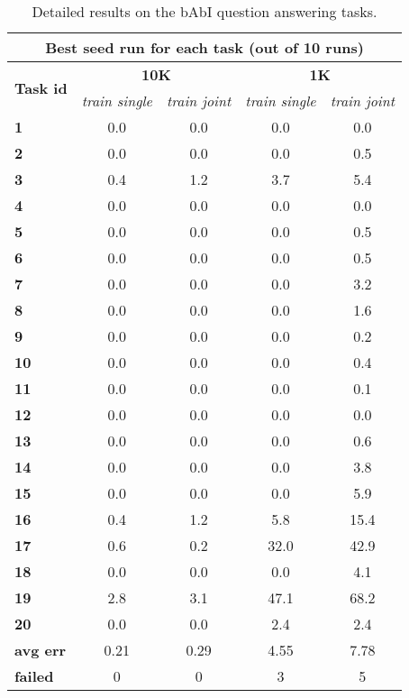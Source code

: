 \begin{table}[t!]
\centering
\caption{Detailed results on the bAbI question answering tasks.}
\label{tbl:babi_details}
\begin{subtable}{0.57\textwidth}
\centering
\begin{adjustbox}{max width=\textwidth}
\begin{tabular}{lcccc}
\toprule
\multicolumn{5}{c}{\bf Best seed run for each task (out of 10 runs) } \\ \midrule
\multirow{2}{*}{ \bf Task id } & \multicolumn{2}{c}{ \bf 10K } & \multicolumn{2}{c}{ \bf 1K } \\  \cmidrule{2-5}
& \textit{train single} & \textit{train joint} & \textit{train single} & \textit{train joint} \\ \midrule
\bf 1 & 0.0 & 0.0 & 0.0 & 0.0 \\
\bf 2 & 0.0 & 0.0 & 0.0 & 0.5 \\
\bf 3 & 0.4 & 1.2 & 3.7 & 5.4 \\
\bf 4 & 0.0 & 0.0 & 0.0 & 0.0 \\
\bf 5 & 0.0 & 0.0 & 0.0 & 0.5 \\
\bf 6 & 0.0 & 0.0 & 0.0 & 0.5 \\
\bf 7 & 0.0 & 0.0 & 0.0 & 3.2 \\
\bf 8 & 0.0 & 0.0 & 0.0 & 1.6 \\
\bf 9 & 0.0 & 0.0 & 0.0 & 0.2 \\
\bf 10 & 0.0 & 0.0 & 0.0 & 0.4 \\
\bf 11 & 0.0 & 0.0 & 0.0 & 0.1 \\
\bf 12 & 0.0 & 0.0 & 0.0 & 0.0 \\
\bf 13 & 0.0 & 0.0 & 0.0 & 0.6 \\
\bf 14 & 0.0 & 0.0 & 0.0 & 3.8 \\
\bf 15 & 0.0 & 0.0 & 0.0 & 5.9 \\
\bf 16 & 0.4 & 1.2 & 5.8 & 15.4 \\
\bf 17 & 0.6 & 0.2 & 32.0 & 42.9 \\
\bf 18 & 0.0 & 0.0 & 0.0 & 4.1 \\
\bf 19 & 2.8 & 3.1 & 47.1 & 68.2 \\
\bf 20 & 0.0 & 0.0 & 2.4 & 2.4 \\ \midrule
\bf avg err & 0.21 & 0.29 & 4.55 & 7.78 \\ \midrule
\bf failed & 0 & 0 & 3 & 5 \\
\bottomrule
\end{tabular}
\end{adjustbox}
\end{subtable}

\end{table}
